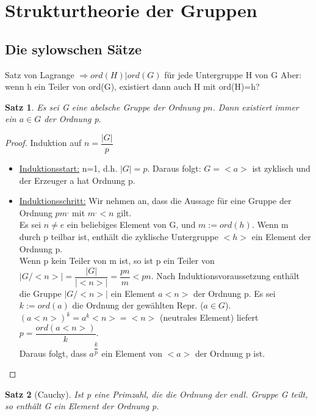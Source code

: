 \documentclass[12pt]{scrartcl}%
\newtheorem{thm}{Satz}
\theoremstyle{definition}
\theoremstyle{remark}
\begin{document}
\section{Strukturtheorie der Gruppen}

\subsection{Die sylowschen Sätze}

Satz von Lagrange $\Rightarrow ord(H)|ord(G)$ für jede Untergruppe H von G
Aber: wenn h ein Teiler von ord(G), existiert dann auch H mit ord(H)=h?

\begin{thm}
Es sei G eine abelsche Gruppe der Ordnung $pn$. Dann existiert immer ein $a \in G$ der Ordnung p. 
\end{thm}

\begin{proof}
Induktion auf $n=\dfrac{|G|}{p}$
\begin{itemize}
\item \underline{Induktionsstart:} n=1, d.h. $|G|=p$. Daraus folgt: $G=<a>$ ist zyklisch und der Erzeuger a hat Ordnung p.
\item \underline{Induktionsschritt:} Wir nehmen an, dass die Aussage für eine Gruppe der Ordnung $pm^,$ mit $m^,<n$ gilt.\\
Es sei $n\neq e$ ein beliebiges Element von G, und $m:=ord(h)$. Wenn m durch p teilbar ist, enthält die zyklische Untergruppe $<h>$ ein Element der Ordnung p. \\
Wenn p kein Teiler von m ist, so ist p ein Teiler von $|G/<n>|=\dfrac{|G|}{|<n>|}=\dfrac{pn}{m}<pn$. Nach Induktionsvoraussetzung enthält die Gruppe $|G/<n>|$ ein Element $a<n>$ der Ordnung p. Es sei $k:=ord(a)$ die Ordnung der gewählten Repr. ($a \in G$). \\
$(a<n>)^k=a^k<n>=<n>$ (neutrales Element) liefert $ p = \dfrac{ord(a<n>)}{k}$. \\
Daraus folgt, dass $a^{\dfrac{k}{p}}$ ein Element von $<a>$ der Ordnung p ist.
\end{itemize}
\end{proof}

\begin{thm} [Cauchy]
Ist p eine Primzahl, die die Ordnung der endl. Gruppe G teilt, so enthält G ein Element der Ordnung p.
\end{thm}
\end{document}
